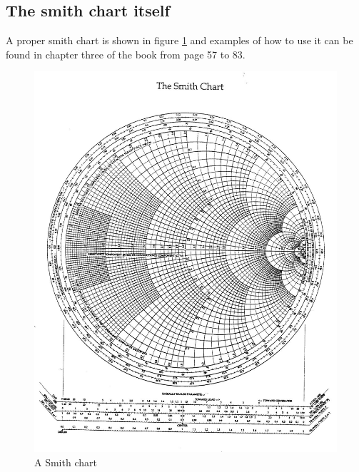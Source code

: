 \documentclass[../transmission.tex]{subfiles}
\begin{document}
		\subsection{The smith chart itself}
			A proper smith chart is shown in figure \ref{fig:chap03_smith_chart} and examples of how to use it can be found in chapter three of the book from page 57 to 83. 
			\begin{figure}[h]
				\centering
				\includegraphics[width=1\linewidth]{../assets/chap03_smith_chart.jpg}
				\caption{A Smith chart}
				\label{fig:chap03_smith_chart}
			\end{figure}
\end{document}
